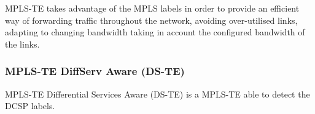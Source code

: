 MPLS-TE takes advantage of the MPLS labels in order to provide an efficient way of forwarding traffic throughout the network, avoiding over-utilised links, adapting to changing bandwidth taking in account the configured bandwidth of the links.\\

\subsubsection{MPLS-TE DiffServ Aware (DS-TE)\\}

MPLS-TE Differential Services Aware (DS-TE) is a MPLS-TE able to detect the DCSP labels.\\


